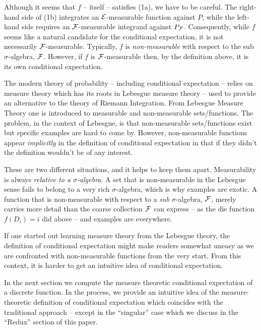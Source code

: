 Although it seems that $f$ -- itself -- satisfies (1a), we have
to be careful. The right-hand side of (1b) integrates an ${\cal E}$-measurable function
against $P$, while the left-hand side requires an ${\cal F}$-measurable integrand against
$P_{\cal F}$. Consequently, while $f$ seems like a natural candidate for the conditional
expectation, it is not necessarily ${\cal F}$-measurable. Typically, $f$ is
{\it non-measurable\/} with respect to the sub $\sigma$-algebra, ${\cal F}$.
However, if $f$ is ${\cal F}$-measurable then, by the definition above,
it is its own conditional expectation.

The modern theory of probability -- including conditional expectation -- 
relies on measure theory which has its roots in Lebesgue measure theory -- 
used to provide an alternative to the theory of Riemann Integration.
From Lebesgue Measure Theory one is introduced to measurable and non-measurable sets/functions. 
The problem, in the context of Lebesgue, is that non-measurable sets/functions exist but 
specific examples are hard to come by. However, non-measurable functions appear 
{\it implicitly\/} in the definition of conditional expectation 
in that if they didn't the definition wouldn't be of any interest.

These are two different situations, and it helps to keep them apart.
Measurability is always {\it relative to a $\sigma$-algebra\/}. A set that is
non-measurable in the Lebesgue sense fails to belong to a very rich $\sigma$-algebra,
which is why examples are exotic. A function that is non-measurable with respect to a
{\it sub\/} $\sigma$-algebra, ${\cal F}$, merely carries more detail than the coarse
collection ${\cal F}$ can express -- as the die function $f(D_i) = i$ did above --
and examples are everywhere.

If one started out learning measure theory from the Lebesgue theory, the 
definition of conditional expectation might make readers somewhat uneasy as 
we are confronted with non-measurable functions from the very start.
From this context, it is harder to get an intuitive idea of conditional expectation. 

In the next section we compute the measure theoretic conditional expectation 
of a discrete function. 
In the process, we provide an intuitive idea of the 
measure-theoretic definition of conditional expectation which coincides with 
the traditional approach -- except in the ``singular'' case
which we discuss in the ``Redux'' section of this paper.

